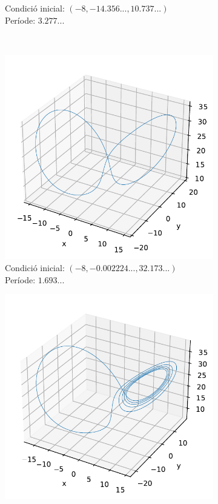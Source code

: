 \documentclass[a4paper]{article}
\theoremstyle{definition}
\begin{document}
\begin{figure}[ht]
\begin{subfigure}[b]{0.45\linewidth}
    \caption{Condició inicial: $(-8, -14.356..., 10.737...)$\\ Període: $3.277...$}
  \end{subfigure}\\
  \begin{subfigure}[b]{0.45\linewidth}
    \centering
    \includegraphics[width=0.95\linewidth]{Images/op3-25-5.pdf}
    \caption{Condició inicial: $(-8, -0.002224..., 32.173...)$\\ Període: $1.693...$}
    \label{fig5}
  \end{subfigure}
  \hfill
  \begin{subfigure}[b]{0.45\linewidth}
    \centering
    \includegraphics[width=0.95\linewidth]{Images/op3-25-6.pdf}

\end{subfigure}
\end{figure}
\end{document}
